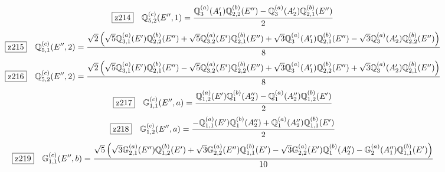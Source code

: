 \documentclass[fleqn,10pt,landscape]{jsarticle}
\begin{document}
\begin{dmath*}
\hspace*{3mm}\fbox{z214}\quad \mathbb{Q}_{5,2}^{(c)}(E^{\prime\prime},1)=\frac{\mathbb{Q}_{3}^{(a)}(A_{1}^{\prime}) \mathbb{Q}_{2,2}^{(b)}(E^{\prime\prime}) - \mathbb{Q}_{3}^{(a)}(A_{2}^{\prime}) \mathbb{Q}_{2,1}^{(b)}(E^{\prime\prime})}{2}
\end{dmath*}
\begin{dmath*}
\hspace*{3mm}\fbox{z215}\quad \mathbb{Q}_{5,1}^{(c)}(E^{\prime\prime},2)=\frac{\sqrt{2} \left(\sqrt{5} \mathbb{Q}_{3,1}^{(a)}(E^{\prime}) \mathbb{Q}_{2,2}^{(b)}(E^{\prime\prime}) + \sqrt{5} \mathbb{Q}_{3,2}^{(a)}(E^{\prime}) \mathbb{Q}_{2,1}^{(b)}(E^{\prime\prime}) + \sqrt{3} \mathbb{Q}_{3}^{(a)}(A_{1}^{\prime}) \mathbb{Q}_{2,1}^{(b)}(E^{\prime\prime}) - \sqrt{3} \mathbb{Q}_{3}^{(a)}(A_{2}^{\prime}) \mathbb{Q}_{2,2}^{(b)}(E^{\prime\prime})\right)}{8}
\end{dmath*}
\begin{dmath*}
\hspace*{3mm}\fbox{z216}\quad \mathbb{Q}_{5,2}^{(c)}(E^{\prime\prime},2)=\frac{\sqrt{2} \left(\sqrt{5} \mathbb{Q}_{3,1}^{(a)}(E^{\prime}) \mathbb{Q}_{2,1}^{(b)}(E^{\prime\prime}) - \sqrt{5} \mathbb{Q}_{3,2}^{(a)}(E^{\prime}) \mathbb{Q}_{2,2}^{(b)}(E^{\prime\prime}) + \sqrt{3} \mathbb{Q}_{3}^{(a)}(A_{1}^{\prime}) \mathbb{Q}_{2,2}^{(b)}(E^{\prime\prime}) + \sqrt{3} \mathbb{Q}_{3}^{(a)}(A_{2}^{\prime}) \mathbb{Q}_{2,1}^{(b)}(E^{\prime\prime})\right)}{8}
\end{dmath*}
\begin{dmath*}
\hspace*{3mm}\fbox{z217}\quad \mathbb{G}_{1,1}^{(c)}(E^{\prime\prime},a)=\frac{\mathbb{Q}_{1,2}^{(a)}(E^{\prime}) \mathbb{Q}_{1}^{(b)}(A_{2}^{\prime\prime}) - \mathbb{Q}_{1}^{(a)}(A_{2}^{\prime\prime}) \mathbb{Q}_{1,2}^{(b)}(E^{\prime})}{2}
\end{dmath*}
\begin{dmath*}
\hspace*{3mm}\fbox{z218}\quad \mathbb{G}_{1,2}^{(c)}(E^{\prime\prime},a)=\frac{- \mathbb{Q}_{1,1}^{(a)}(E^{\prime}) \mathbb{Q}_{1}^{(b)}(A_{2}^{\prime\prime}) + \mathbb{Q}_{1}^{(a)}(A_{2}^{\prime\prime}) \mathbb{Q}_{1,1}^{(b)}(E^{\prime})}{2}
\end{dmath*}
\begin{dmath*}
\hspace*{3mm}\fbox{z219}\quad \mathbb{G}_{1,1}^{(c)}(E^{\prime\prime},b)=\frac{\sqrt{5} \left(\sqrt{3} \mathbb{G}_{2,1}^{(a)}(E^{\prime\prime}) \mathbb{Q}_{1,2}^{(b)}(E^{\prime}) + \sqrt{3} \mathbb{G}_{2,2}^{(a)}(E^{\prime\prime}) \mathbb{Q}_{1,1}^{(b)}(E^{\prime}) - \sqrt{3} \mathbb{G}_{2,2}^{(a)}(E^{\prime}) \mathbb{Q}_{1}^{(b)}(A_{2}^{\prime\prime}) - \mathbb{G}_{2}^{(a)}(A_{1}^{\prime\prime}) \mathbb{Q}_{1,1}^{(b)}(E^{\prime})\right)}{10}
\end{dmath*}
\end{document}
